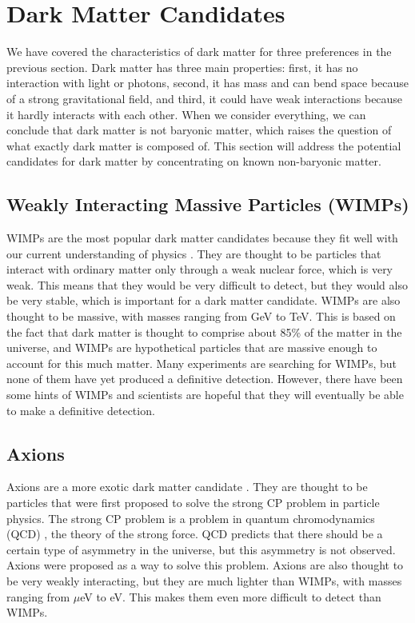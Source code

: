 \documentclass[10pt, oneside]{book}
\numberwithin{equation}{chapter}
\begin{document}
\section{Dark Matter Candidates}
We have covered the characteristics of dark matter for three preferences in the previous section. Dark matter has three main properties: first, it has no interaction with light or photons, second, it has mass and can bend space because of a strong gravitational field, and third, it could have weak interactions because it hardly interacts with each other. When we consider everything, we can conclude that dark matter is not baryonic matter, which raises the question of what exactly dark matter is composed of. This section will address the potential candidates for dark matter by concentrating on known non-baryonic matter.

\subsection{Weakly Interacting Massive Particles (WIMPs)}
WIMPs are the most popular dark matter candidates because they fit well with our current understanding of physics \cite{Bertone_2018}. They are thought to be particles that interact with ordinary matter only through a weak nuclear force, which is very weak. This means that they would be very difficult to detect, but they would also be very stable, which is important for a dark matter candidate.
WIMPs are also thought to be massive, with masses ranging from GeV to TeV. This is based on the fact that dark matter is thought to comprise about 85\% of the matter in the universe, and WIMPs are hypothetical particles that are massive enough to account for this much matter.
Many experiments are searching for WIMPs, but none of them have yet produced a definitive detection. However, there have been some hints of WIMPs and scientists are hopeful that they will eventually be able to make a definitive detection.
\subsection{Axions}
Axions are a more exotic dark matter candidate \cite{bauer2018introduction}. They are thought to be particles that were first proposed to solve the strong CP problem in particle physics. The strong CP problem is a problem in quantum chromodynamics (QCD) \cite{Bertone_2018}, the theory of the strong force. QCD predicts that there should be a certain type of asymmetry in the universe, but this asymmetry is not observed. Axions were proposed as a way to solve this problem.
Axions are also thought to be very weakly interacting, but they are much lighter than WIMPs, with masses ranging from $\mu$eV to eV. This makes them even more difficult to detect than WIMPs.
\end{document}
